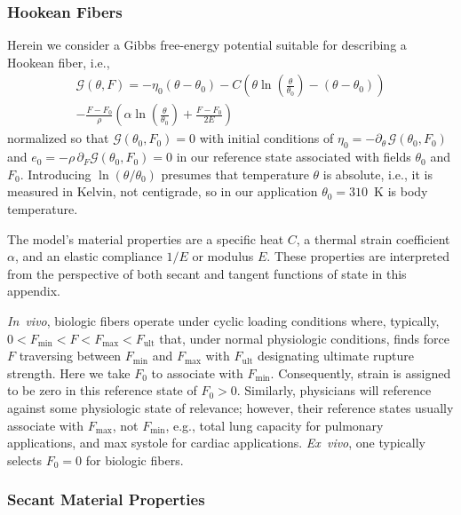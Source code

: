 \subsubsection{Hookean Fibers}

Herein we consider a Gibbs free-energy potential suitable for describing a Hookean fiber, i.e.,
\begin{multline}
    \mathcal{G} (\theta , F) = -\eta_0 (\theta - \theta_0) -
    C \left( \theta \ln \left( \frac{\theta}{\theta_0} \right) - (\theta - \theta_0) \right) \\ - 
    \frac{F - F_0}{\rho} \left( \alpha \ln \left( \frac{\theta}{\theta_0} \right) + \frac{F - F_0}{2E}  \right)
    \label{GreenFiberEnergy}
\end{multline}
normalized so that $\mathcal{G}(\theta_0 , F_0) = 0$ with initial conditions of $\eta_0 = -\partial_{\theta\,} \mathcal{G} (\theta_0 , F_0)$ and $e_0 = -\rho \, \partial_F \mathcal{G} (\theta_0 , F_0) = 0$ in our reference state associated with fields $\theta_0$ and $F_0$.  Introducing $\ln ( \theta / \theta_0 )$ presumes that temperature $\theta$ is absolute, i.e., it is measured in Kelvin, not centigrade, so in our application $\theta_0 = 310$~K is body temperature.

The model's material properties are a specific heat $C$, a thermal strain coefficient $\alpha$, and an elastic compliance $1/E$ or modulus $E$.  These properties are interpreted from the perspective of both secant and tangent functions of state in this appendix.

\textit{In~vivo}, biologic fibers operate under cyclic loading conditions where, typically, \mbox{$0 < F_{\min} < F < F_{\max} < F_{\mathrm{ult}}$} that, under normal physiologic conditions, finds force $F$ traversing between $F_{\min}$ and $F_{\max}$ with $F_{\mathrm{ult}}$ designating ultimate rupture strength.  Here we take $F_0$ to associate with $F_{\min}$.  Consequently, strain is assigned to be zero in this reference state of $F_0>0$.  Similarly, physicians will reference against some physiologic state of relevance; however, their reference states usually associate with $F_{\max}$, not $F_{\min}$, e.g., total lung capacity for pulmonary applications, and max systole for cardiac applications.  \textit{Ex~vivo}, one typically selects $F_0 = 0$ for biologic fibers.

\subsubsection{Secant Material Properties}

